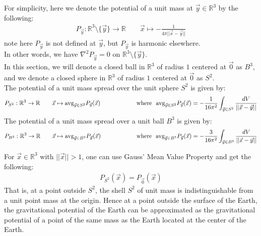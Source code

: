 \documentclass[11pt,oneside]{book}
\theoremstyle{break}
\theoremstyle{break}
\newtheorem{lem}{Lemma}[thm]
\newcommand{\R}{\mathbb{R}}
\begin{document}
For simplicity, here we denote the potential of a unit mass at $\vec{y}\in \R^3$ by the following:
\begin{align*}
P_{\vec{y}} : \R^3\setminus \{\vec{y}\} \to \R \qquad \vec{x}\mapsto -\frac{1}{4\pi ||\vec{x} - \vec{y}||}
\end{align*}
note here $P_{\vec{y}}$ is not defined at $\vec{y}$, but $P_{\vec{y}}$ is harmonic elsewhere. \\
In other words, we have $\nabla^2 P_{\vec{y}} = 0$ on $\R^3\setminus \{\vec{y}\}$.\\

In this section, we will denote a closed ball in $\R^3$ of radius $1$ centered at $\vec{0}$ as $B^3$, and we denote a closed sphere in $\R^3$ of radius $1$ centered at $\vec{0}$ as $S^2$.\\

The potential of a unit mass spread over the unit sphere $S^2$ is given by:
\begin{align*}
P_{S^2} : \R^3 \to \R \qquad \vec{x}\mapsto\text{\text{avg}}_{\vec{y}\in S^2}P_{\vec{y}}(\vec{x})\qquad\qquad\qquad  \text{where}\ \ \text{\text{avg}}_{\vec{y}\in S^2}P_{\vec{y}}(\vec{x})=- \frac{1}{16\pi^2}\int_{\vec{y}\in S^2} \frac{dV}{||\vec{x}-\vec{y}||}
\end{align*}
The potential of a unit mass spread over a unit ball $B^3$ is given by:
\begin{align*}
P_{B^3} : \R^3 \to \R \qquad \vec{x}\mapsto\text{\text{avg}}_{\vec{y}\in B^3}P_{\vec{y}}(\vec{x}) \qquad\qquad\qquad \text{where}\ \  \text{\text{avg}}_{\vec{y}\in B^3}P_{\vec{y}}(\vec{x})=- \frac{3}{16\pi^2}\int_{\vec{y}\in B^3} \frac{dV}{||\vec{x}-\vec{y}||}
\end{align*}

For $\vec{x}\in \R^3$ with $||\vec{x}|| >1$, one can use Gauss' Mean Value Property and get the following:
\begin{align*}
P_{S^2}(\vec{x}) = P_{\vec{0}}(\vec{x})
\end{align*}
That is, at a point outside $S^2$, the shell $S^2$ of unit mass is indistinguishable from a unit point mass at the origin. Hence at a point outside the surface of the Earth, the gravitational potential of the Earth can be approximated as the gravitational potential of a point of the same mass as the Earth located at the center of the Earth.

\end{document}
